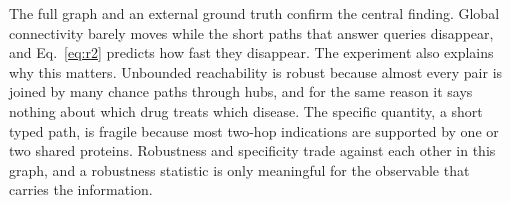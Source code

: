 The full graph and an external ground truth confirm the central finding. Global
connectivity barely moves while the short paths that answer queries disappear,
and Eq.~\eqref{eq:r2} predicts how fast they disappear. The experiment also
explains why this matters. Unbounded reachability is robust because almost
every pair is joined by many chance paths through hubs, and for the same reason
it says nothing about which drug treats which disease. The specific quantity, a
short typed path, is fragile because most two-hop indications are supported by
one or two shared proteins. Robustness
and specificity trade against each other in this graph, and a robustness
statistic is only meaningful for the observable that carries the information.
